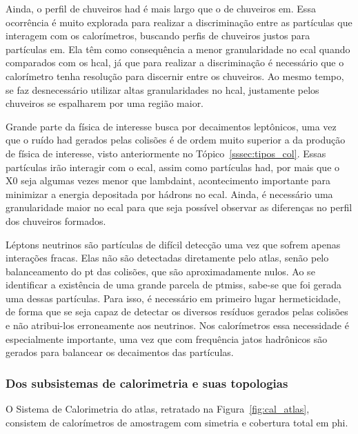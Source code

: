 Ainda, o perfil de chuveiros \gls{had} é mais largo que o de chuveiros
\gls{em}. Essa ocorrência é muito explorada para realizar a discriminação 
entre as partículas que interagem com os calorímetros, buscando perfis de chuveiros
justos para partículas \gls{em}. Ela têm como consequência 
a menor granularidade no \gls{ecal} quando comparados com os \gls{hcal}, já que
para realizar a discriminação é necessário que o calorímetro tenha resolução
para discernir entre os chuveiros. Ao mesmo tempo, se faz desnecessário
utilizar altas granularidades no \gls{hcal}, justamente pelos chuveiros se
espalharem por uma região maior.

Grande parte da física de interesse busca por decaimentos
leptônicos, uma vez que o ruído \gls{had} gerados pelas colisões é de ordem
muito superior a da produção de física de interesse, visto anteriormente no
Tópico~\ref{sssec:tipos_col}. Essas partículas irão interagir com o \gls{ecal},
assim como partículas \gls{had}, por mais que o \gls{X0} seja algumas vezes 
menor que \gls{lambdaint}, acontecimento importante para minimizar a energia depositada
por hádrons no \gls{ecal}. Ainda, é necessário uma granularidade 
maior no \gls{ecal} para que seja possível observar as diferenças no 
perfil dos chuveiros formados.

Léptons neutrinos são partículas de difícil detecção uma vez que sofrem 
apenas interações fracas. Elas não são detectadas diretamente pelo 
\gls{atlas}, senão pelo balanceamento do \gls{pt} das colisões, que são 
aproximadamente nulos. Ao se identificar a existência de uma grande parcela de 
\gls{ptmiss}, sabe-se que foi gerada uma dessas partículas. Para isso, é necessário em
primeiro lugar hermeticidade, de forma que se seja capaz de
detectar os diversos resíduos gerados pelas colisões e não atribui-los erroneamente aos neutrinos. 
Nos calorímetros essa necessidade é especialmente importante, uma vez que com frequência 
jatos hadrônicos são gerados para balancear os decaimentos das partículas.

\subsubsection{Dos subsistemas de calorimetria e suas topologias}
\label{sssec:cal_estrutura}

O Sistema de Calorimetria \cite{cal_tdr,ecal_tdr,hcal_tdr} do \gls{atlas}, retratado na
Figura~\ref{fig:cal_atlas}, consistem de calorímetros de amostragem com 
simetria e cobertura total em \gls{phi}.

